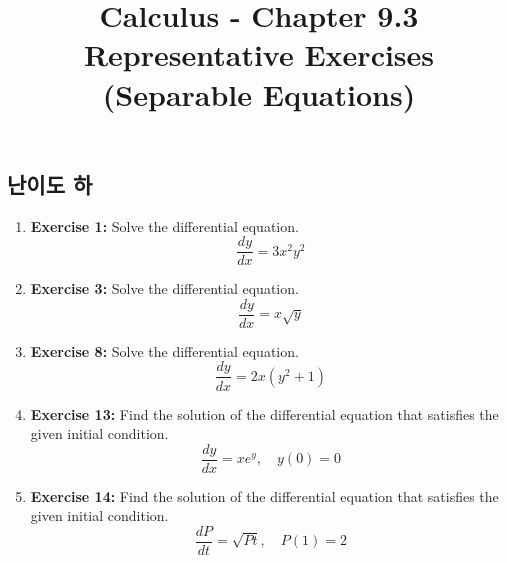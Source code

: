 \documentclass[12pt, a4paper]{article}
\title{Calculus - Chapter 9.3 Representative Exercises (Separable Equations)}
\begin{document}
\maketitle
\hrulefill
\vspace{1em}

\subsection*{난이도 하}
\begin{enumerate}
    \item \textbf{Exercise 1:} Solve the differential equation.
    \[ \frac{dy}{dx} = 3x^2y^2 \]

    \item \textbf{Exercise 3:} Solve the differential equation.
    \[ \frac{dy}{dx} = x\sqrt{y} \]

    \item \textbf{Exercise 8:} Solve the differential equation.
    \[ \frac{dy}{dx} = 2x(y^2 + 1) \]

    \item \textbf{Exercise 13:} Find the solution of the differential equation that satisfies the given initial condition.
    \[ \frac{dy}{dx} = xe^y, \quad y(0)=0 \]

    \item \textbf{Exercise 14:} Find the solution of the differential equation that satisfies the given initial condition.
    \[\frac{dP}{dt} = \sqrt{Pt}, \quad P(1)=2 \]
\end{enumerate}

\hrulefill
\vspace{1em}
\end{document}
